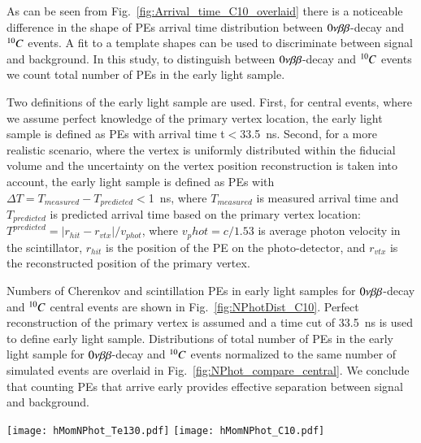 As can be seen from Fig.~\ref{fig:Arrival_time_C10_overlaid} there is a noticeable difference
in the shape of PEs arrival time distribution between $0\nu\beta\beta$-decay and $^{10}C$ events. A fit
to a template shapes can be used to discriminate between signal and background. In this study,
to distinguish between $0\nu\beta\beta$-decay and $^{10}C$ events we count total number of PEs in the
early light sample. 

Two definitions of the early light sample are used. First, for central events, where we assume 
perfect knowledge of the primary vertex location, the early light sample is defined as PEs 
with arrival time t$<$33.5~ns. Second, for a more realistic scenario, where the vertex is uniformly 
distributed within the fiducial volume and the uncertainty on the vertex position reconstruction
is taken into account, the early light sample is defined as PEs with $\Delta T=T_{measured} - 
T_{predicted}<$1~ns, where $T_{measured}$ is measured arrival time and $T_{predicted}$
is predicted arrival time based on the primary vertex location: 
$T^{predicted} = |r_{hit} - r_{vtx}|/v_{phot}$, where $v_phot = c/1.53$ is average photon velocity
in the scintillator, $r_{hit}$ is the position of the PE on the photo-detector, and $r_{vtx}$ is the
reconstructed position of the primary vertex.


Numbers of Cherenkov and scintillation PEs in early light samples for $0\nu\beta\beta$-decay and 
$^{10}C$ central events are shown in Fig.~\ref{fig:NPhotDist_C10}. Perfect reconstruction of the 
primary vertex is assumed and a time cut of 33.5~ns is used to define early light sample. 
Distributions of total number of PEs in the early light sample for $0\nu\beta\beta$-decay and $^{10}C$ events
normalized to the same number of simulated events are overlaid in Fig.~\ref{fig:NPhot_compare_central}.
We conclude that counting PEs that arrive early provides effective separation between signal and
background.


\begin{figure*}[ht]
  \centering
  \texttt{[image: hMomNPhot\_Te130.pdf]}
  \texttt{[image: hMomNPhot\_C10.pdf]}
  \caption{Number of PEs after 33.5~ns time cut applied to events simulated at the center
    of the detector. Cherenkov (\emph{dashed red line}), 
    scintillation (\emph{dotted blue line}), and total (\emph{solid black line}) PEs are
    compared separately for the simulation of 1000 $^{130}$Te 0{\nbb} decay (left panel)
    and of 4152 $^{10}$C (\emph{right panel}) events.} 
\label{fig:NPhotDist_C10}
\end{figure*}




